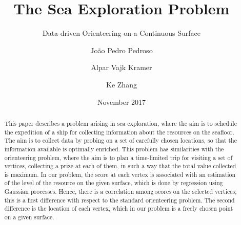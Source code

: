 \documentclass[smallextended]{svjour3}
\begin{document}


\title{The Sea Exploration Problem}
\subtitle{Data-driven Orienteering on a Continuous Surface}


\author{Jo\~{a}o Pedro Pedroso \and Alpar Vajk Kramer \and Ke Zhang}



\date{November 2017}


\maketitle

\begin{abstract}
  This paper describes a problem arising in sea exploration, where the aim is to schedule the expedition of a ship for collecting information about the resources on the seafloor.  The aim is to collect data by probing on a set of carefully chosen locations, so that the information available is optimally enriched.  This problem has similarities with the orienteering problem, where the aim is to plan a time-limited trip for visiting a set of vertices, collecting a prize at each of them, in such a way that the total value collected is maximum.  In our problem, the score at each vertex is associated with an estimation of the level of the resource on the given surface, which is done by regression using Gaussian processes.  Hence, there is a correlation among scores on the selected vertices; this is a first difference with respect to the standard orienteering problem.  The second difference is the location of each vertex, which in our problem is a freely chosen point on a given surface.
\end{abstract}

\end{document}
